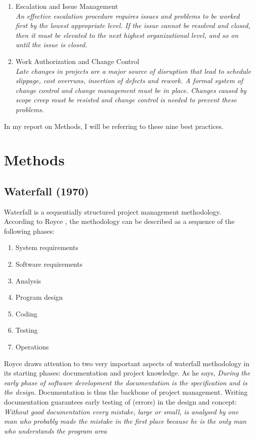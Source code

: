 \begin{enumerate}
\item Escalation and Issue Management \\
\textit{An effective escalation procedure requires issues and problems to be worked first by the lowest appropriate level. If the issue cannot be resolved and closed, then it must be elevated to the next highest organizational level, and so on until the issue is closed. }\cite{salapatas2000}

\item Work Authorization and Change Control \\
\textit{Late changes in projects are a major source of disruption that lead to schedule slippage, cost overruns, insertion of defects and rework. A formal system of change control and change management must be in place. Changes caused by scope creep must be resisted and change control is needed to prevent these problems.}\cite{salapatas2000}

\end{enumerate}

In my report on Methods, I will be referring to these nine best practices.

\section{Methods}

\subsection{Waterfall (1970)}\label{waterfall}

Waterfall is a sequentially structured project management methodology. According to Royce \cite{Royce1970}, the methodology can
be described as a sequence of the following phases:

\begin{enumerate}

\item
  System requirements
\item
  Software requirements
\item
  Analysis
\item
  Program design
\item
  Coding
\item
  Testing
\item
  Operations
\end{enumerate}

Royce draws attention to two very important aspects of waterfall
methodology in its starting phases: documentation and project knowledge.
As he says, \emph{During the early phase of software development the
documentation is the specification and is the design.}\cite{Royce1970} Documentation is thus the backbone of project management. Writing documentation guarantees early testing of (errors) in the design and concept: \emph{Without good documentation every mistake,
large or small, is analysed by one man who probably made the mistake in the first place because
he is the only man who understands the program area}\cite{Royce1970}

